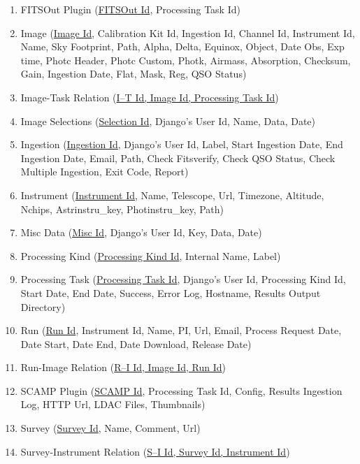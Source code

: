 \documentclass[twoside,a4paper]{article}
\begin{document}
\begin{enumerate}
\item FITSOut Plugin (\underline{FITSOut Id}, Processing Task Id)
\item Image (\underline{Image Id}, Calibration Kit Id, Ingestion Id, Channel Id, Instrument Id, Name, Sky Footprint, Path, Alpha, Delta, Equinox, Object, Date Obs, Exp time, Photc Header, Photc Custom, Photk, Airmass, Absorption, Checksum, Gain, Ingestion Date, Flat, Mask, Reg, QSO Status)
\item Image-Task Relation (\underline{I--T Id, Image Id, Processing Task Id}) 
\item Image Selections (\underline{Selection Id}, Django's User Id, Name, Data, Date)
\item Ingestion (\underline{Ingestion Id}, Django's User Id, Label, Start Ingestion Date, End Ingestion Date, Email, Path, Check Fitsverify, Check QSO Status, Check Multiple Ingestion, Exit Code, Report)
\item Instrument (\underline{Instrument Id}, Name, Telescope, Url, Timezone, Altitude, Nchips, Astrinstru\_key, Photinstru\_key, Path)
\item Misc Data (\underline{Misc Id}, Django's User Id, Key, Data, Date)
\item Processing Kind (\underline{Processing Kind Id}, Internal Name, Label)
\item Processing Task (\underline{Processing Task Id}, Django's User Id, Processing Kind Id, Start Date, End Date, Success, Error Log, Hostname, Results Output Directory)
\item Run (\underline{Run Id}, Instrument Id, Name, PI, Url, Email, Process Request Date, Date Start, Date End, Date Download, Release Date)
\item Run-Image Relation (\underline{R--I Id, Image Id, Run Id}) 
\item SCAMP Plugin (\underline{SCAMP Id}, Processing Task Id, Config, Results Ingestion Log, HTTP Url, LDAC Files, Thumbnails)
\item Survey (\underline{Survey Id}, Name, Comment, Url)
\item Survey-Instrument Relation (\underline{S--I Id, Survey Id, Instrument Id}) 
\end{enumerate}
\end{document}
